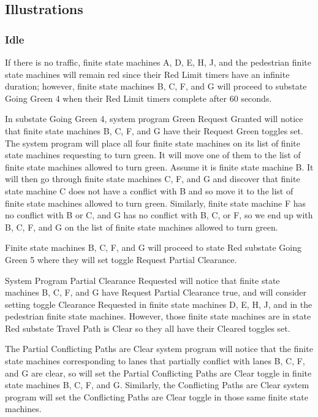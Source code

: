 \documentclass[letterpaper,twoside]{article}
\begin{document}
\subsection{Illustrations}

\subsubsection{Idle}

If there is no traffic, finite state machines A, D, E, H, J, and the
pedestrian finite state machines will remain red
since their Red Limit timers have an infinite duration; however,
finite state machines B, C, F, and G will proceed to substate
Going Green 4 when their Red Limit timers complete after 60 seconds.

In substate Going Green 4, system program Green Request Granted will notice
that finite state machines B, C, F, and G have their Request Green toggles
set.
The system program will place all four finite state machines on its list of
finite state machines requesting to turn green.
It will move one of them to the list of finite state machines allowed to
turn green.  Assume it is finite state machine B.
It will then go through finite state machines C, F, and G
and discover that finite state machine C does not have
a conflict with B and so move it to the list of finite state machines
allowed to turn green.  Similarly, finite state machine F has no conflict
with B or C, and G has no conflict with B, C, or F, so we end up with
B, C, F, and G on the list of finite state machines allowed to turn green.

Finite state machines B, C, F, and G will proceed to state Red
substate Going Green 5 where they will set toggle Request Partial Clearance.

System Program Partial Clearance Requested will notice that finite state
machines B, C, F, and G have Request Partial Clearance true,
and will consider setting toggle Clearance Requested in finite state machines
D, E, H, J, and in the pedestrian finite state machines.
However, those finite state machines
are in state Red substate Travel Path is Clear so they all have their
Cleared toggles set.

The Partial Conflicting Paths are Clear system program will notice that the
finite state machines corresponding to lanes that partially conflict with
lanes B, C, F, and G are clear, so will set the
Partial Conflicting Paths are Clear toggle in finite state machines
B, C, F, and G.
Similarly, the Conflicting Paths are Clear system program will set
the Conflicting Paths are Clear toggle in those same finite state machines.
\end{document}
